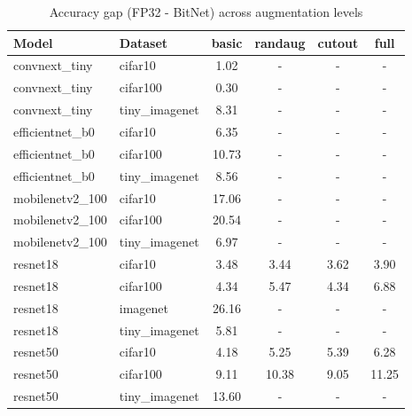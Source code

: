 \begin{table}[h]
\centering
\caption{Accuracy gap (FP32 - BitNet) across augmentation levels}
\label{tab:augmentation_ablation}
\begin{tabular}{llcccc}
\toprule
Model & Dataset & basic & randaug & cutout & full \\
\midrule
convnext_tiny & cifar10 & 1.02 & - & - & - \\
convnext_tiny & cifar100 & 0.30 & - & - & - \\
convnext_tiny & tiny_imagenet & 8.31 & - & - & - \\
efficientnet_b0 & cifar10 & 6.35 & - & - & - \\
efficientnet_b0 & cifar100 & 10.73 & - & - & - \\
efficientnet_b0 & tiny_imagenet & 8.56 & - & - & - \\
mobilenetv2_100 & cifar10 & 17.06 & - & - & - \\
mobilenetv2_100 & cifar100 & 20.54 & - & - & - \\
mobilenetv2_100 & tiny_imagenet & 6.97 & - & - & - \\
resnet18 & cifar10 & 3.48 & 3.44 & 3.62 & 3.90 \\
resnet18 & cifar100 & 4.34 & 5.47 & 4.34 & 6.88 \\
resnet18 & imagenet & 26.16 & - & - & - \\
resnet18 & tiny_imagenet & 5.81 & - & - & - \\
resnet50 & cifar10 & 4.18 & 5.25 & 5.39 & 6.28 \\
resnet50 & cifar100 & 9.11 & 10.38 & 9.05 & 11.25 \\
resnet50 & tiny_imagenet & 13.60 & - & - & - \\
\bottomrule
\end{tabular}
\end{table}